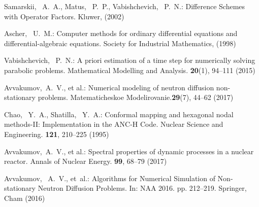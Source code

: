 \documentclass[runningheads]{llncs}
\begin{document}
\begin{thebibliography}{8}
Samarskii, ~A.~A., Matus, ~P.~P., Vabishchevich, ~P.~N.: Difference Schemes
  with Operator Factors. Kluwer, (2002)
  
Ascher, ~U.~M.: Computer methods for ordinary differential equations and
  differential-algebraic equations. Society for Industrial Mathematics, (1998)

Vabishchevich, ~P.~N.: A priori estimation of a time step for
  numerically solving parabolic problems. Mathematical Modelling and
  Analysis. \textbf{20}(1), 94--111 (2015)

Avvakumov,~A.~V., et al.: Numerical modeling of neutron diffusion non-stationary problems. Matematicheskoe Modelirovanie.\textbf{29}(7), 44--62 (2017)

Chao, ~Y.~A., Shatilla, ~Y.~A.: Conformal mapping and hexagonal nodal methods-II: Implementation in the ANC-H Code. Nuclear Science and Engineering. \textbf{121}, 210--225 (1995)

Avvakumov,~A.~V., et al.: Spectral properties of dynamic processes in a nuclear reactor. Annals of Nuclear Energy. \textbf{99}, 68--79 (2017) 

Avvakumov, ~A.~V., et~al.: Algorithms for Numerical Simulation of Non-stationary Neutron Diffusion Problems. In: NAA 2016. pp. 212--219. Springer, Cham (2016)

\end{thebibliography}
\end{document}
